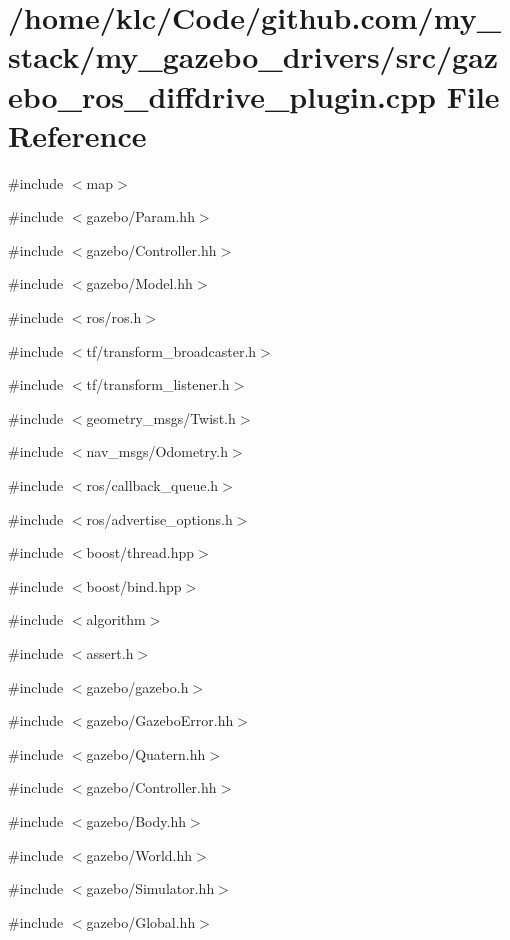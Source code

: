\section{/home/klc/Code/github.com/my\_\-stack/my\_\-gazebo\_\-drivers/src/gazebo\_\-ros\_\-diffdrive\_\-plugin.cpp File Reference}
\label{gazebo__ros__diffdrive__plugin_8cpp}
{\ttfamily \#include $<$map$>$}\par
{\ttfamily \#include $<$gazebo/Param.hh$>$}\par
{\ttfamily \#include $<$gazebo/Controller.hh$>$}\par
{\ttfamily \#include $<$gazebo/Model.hh$>$}\par
{\ttfamily \#include $<$ros/ros.h$>$}\par
{\ttfamily \#include $<$tf/transform\_\-broadcaster.h$>$}\par
{\ttfamily \#include $<$tf/transform\_\-listener.h$>$}\par
{\ttfamily \#include $<$geometry\_\-msgs/Twist.h$>$}\par
{\ttfamily \#include $<$nav\_\-msgs/Odometry.h$>$}\par
{\ttfamily \#include $<$ros/callback\_\-queue.h$>$}\par
{\ttfamily \#include $<$ros/advertise\_\-options.h$>$}\par
{\ttfamily \#include $<$boost/thread.hpp$>$}\par
{\ttfamily \#include $<$boost/bind.hpp$>$}\par
{\ttfamily \#include $<$algorithm$>$}\par
{\ttfamily \#include $<$assert.h$>$}\par
{\ttfamily \#include $<$gazebo/gazebo.h$>$}\par
{\ttfamily \#include $<$gazebo/GazeboError.hh$>$}\par
{\ttfamily \#include $<$gazebo/Quatern.hh$>$}\par
{\ttfamily \#include $<$gazebo/Controller.hh$>$}\par
{\ttfamily \#include $<$gazebo/Body.hh$>$}\par
{\ttfamily \#include $<$gazebo/World.hh$>$}\par
{\ttfamily \#include $<$gazebo/Simulator.hh$>$}\par
{\ttfamily \#include $<$gazebo/Global.hh$>$}\par
